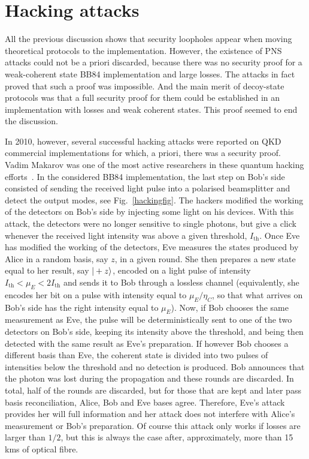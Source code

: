 \documentclass[a4paper]{article}
\begin{document}
\section{Hacking attacks}

All the previous discussion shows that security loopholes appear when moving theoretical protocols to the implementation. However, the existence of PNS attacks could not be a priori discarded, because there was no security proof for a weak-coherent state BB84 implementation and large losses. The attacks in fact proved that such a proof was impossible. And the main merit of decoy-state protocols was that a full security proof for them could be established in an implementation with losses and weak coherent states. This proof seemed to end the discussion.

In 2010, however, several successful hacking attacks were reported on QKD commercial implementations for which, a priori, there was a security proof. Vadim Makarov was one of the most active researchers in these quantum hacking efforts~\cite{Makarov}. In the considered BB84 implementation, the last step on Bob's side consisted of sending the received light pulse into a polarised beamsplitter and detect the output modes, see Fig.~\ref{hackingfig}. The hackers modified the working of the detectors on Bob's side by injecting some light on his devices. With this attack, the detectors were no longer sensitive to single photons, but give a click whenever the received light intensity was above a given threshold, $I_{\text{th}}$. Once Eve has modified the working of the detectors, Eve measures the states produced by Alice in a random basis, say $z$, in a given round. She then prepares a new state equal to her result, say $|+z\rangle$, encoded on a light pulse of intensity $I_{\text{th}}<\mu_E<2I_{\text{th}}$  and sends it to Bob through a lossless channel (equivalently, she encodes her bit on a pulse with intensity equal to $\mu_E/\eta_C$, so that what arrives on Bob's side has the right intensity equal to $\mu_E$). Now, if Bob chooses the same measurement as Eve, the pulse will be deterministically sent to one of the two detectors on Bob's side, keeping its intensity above the threshold, and being then detected with the same result as Eve's preparation. If however Bob chooses a different basis than Eve, the coherent state is divided into two pulses of intensities below the threshold and no detection is produced. Bob announces that the photon was lost during the propagation and these rounds are discarded. In total, half of the rounds are discarded, but for those that are kept and later pass basis reconciliation, Alice, Bob and Eve bases agree. Therefore, Eve's attack provides her will full information and her attack does not interfere with Alice's measurement or Bob's preparation. Of course this attack only works if losses are larger than $1/2$, but this is always the case after, approximately, more than 15 kms of optical fibre. 
\end{document}
